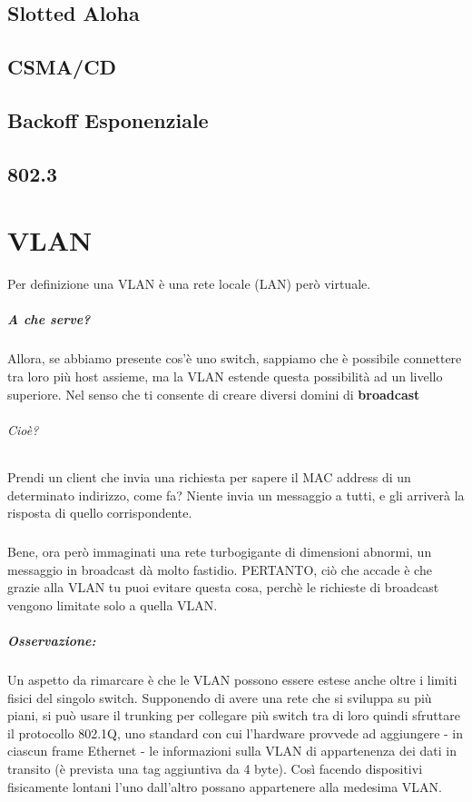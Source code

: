 \documentclass[12pt, a4paper, openany, twoside]{book}
\begin{document}
\section{Slotted Aloha}
\section{CSMA/CD}
\section{Backoff Esponenziale}
\section{802.3}





\chapter{VLAN}
Per definizione una VLAN è una rete locale (LAN) però virtuale.
\paragraph{A che serve? }
Allora, se abbiamo presente cos'è uno switch, sappiamo che è possibile connettere
tra loro più host assieme, ma la VLAN estende questa possibilità ad un livello
superiore. Nel senso che ti consente di creare diversi domini di \textbf{broadcast}
\subparagraph{Cioè?} Prendi un client che invia una richiesta per sapere il MAC
address di un determinato indirizzo, come fa? Niente invia un messaggio a tutti,
e gli arriverà la risposta di quello corrispondente.
\paragraph{}
Bene, ora però immaginati una rete turbogigante di dimensioni abnormi, un messaggio
in broadcast dà molto fastidio. PERTANTO, ciò che accade è che grazie alla
VLAN tu puoi evitare questa cosa, perchè le richieste di broadcast vengono 
limitate solo a quella VLAN. 
\paragraph{Osservazione: }Un aspetto da rimarcare è che le VLAN possono essere 
estese anche oltre i limiti fisici del singolo switch.
Supponendo di avere una rete che si sviluppa su più piani, si può usare il 
trunking per collegare più switch tra di loro quindi sfruttare il protocollo 
802.1Q, uno standard con cui l'hardware provvede ad aggiungere - in ciascun frame 
Ethernet - le informazioni sulla VLAN di appartenenza dei dati in transito 
(è prevista una tag aggiuntiva da 4 byte).
Così facendo dispositivi fisicamente lontani l'uno dall'altro possano appartenere 
alla medesima VLAN.
\end{document}
